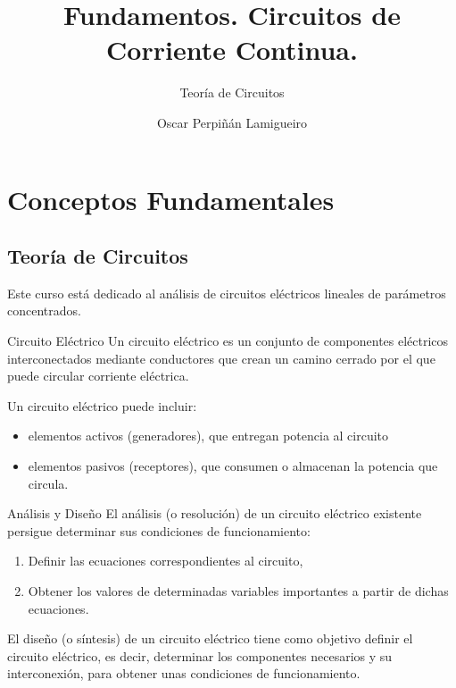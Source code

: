 \documentclass[aspectratio=169, usenames,svgnames,dvipsnames]{beamer}
\author{Oscar Perpiñán Lamigueiro}
\date{}
\title{Fundamentos. Circuitos de Corriente Continua.}
\subtitle{Teoría de Circuitos}
\begin{document}
\maketitle
\section{Conceptos Fundamentales}
\label{sec:orgf4061e5}
\subsection{Teoría de Circuitos}
\label{sec:orge83dcf6}
\begin{frame}[label={sec:org266a77e}]{}
Este curso está dedicado al \alert{análisis} de \alert{circuitos eléctricos} \alert{lineales} de \alert{parámetros concentrados}.
\end{frame}
\begin{frame}[label={sec:orgfcf99a2}]{Circuito Eléctrico}
Un \alert{circuito eléctrico} es un conjunto de componentes eléctricos interconectados mediante conductores que crean un camino cerrado por el que puede circular corriente eléctrica. 

Un circuito eléctrico puede incluir:
\begin{itemize}
\item \alert{elementos activos} (generadores), que entregan potencia al circuito
\item \alert{elementos pasivos} (receptores), que consumen o almacenan la potencia que circula.
\end{itemize}
\end{frame}
\begin{frame}[label={sec:org4cd3ebb}]{Análisis y Diseño}
El \alert{análisis} (o resolución) de un circuito eléctrico existente persigue determinar sus condiciones de funcionamiento:
\begin{enumerate}
\item Definir las ecuaciones correspondientes al circuito,
\item Obtener los valores de determinadas variables importantes a partir de dichas ecuaciones.
\end{enumerate}

El \alert{diseño} (o síntesis) de un circuito eléctrico tiene como objetivo definir el circuito eléctrico, es decir, determinar los componentes necesarios y su interconexión, para obtener unas condiciones de funcionamiento.
\end{frame}
\end{document}
